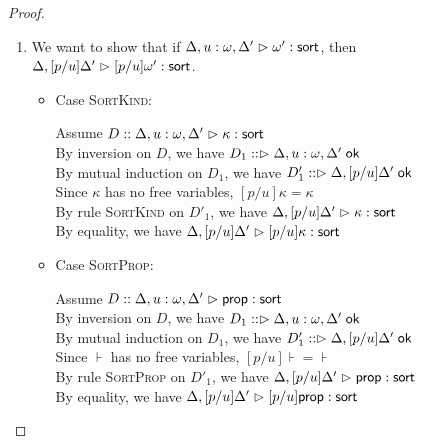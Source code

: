 \begin{proof}
\begin{enumerate}
\item We want to show that if 
         $\judgeSort[\Delta, u:\omega, \Delta']{\omega'}$,  then
         $\judgeSort[{\Delta, [p/u]\Delta'}]{[p/u]\omega'}$. 

  \begin{itemize}
  \item Case \textsc{SortKind}: 
    \begin{tabbedproof}
      \oo Assume $D :: \judgeSort[\Delta, u:\omega, \Delta']{\kappa}$ \\
      \ooo By inversion on $D$, we have $D_1 :: \judgeACtx{\Delta, u:\omega, \Delta'}$ \\
      \ooo By mutual induction on $D_1$, we have 
             $D'_1 :: \judgeACtx{\Delta, [p/u]\Delta'}$ \\
      \ooo Since $\kappa$ has no free variables, $[p/u]\kappa = \kappa$ \\
      \ooo By rule \textsc{SortKind} on $D'_1$, we have 
             $\judgeSort[{\Delta, [p/u]\Delta'}]{\kappa}$ \\
      \ooo By equality, we have 
             $\judgeSort[{\Delta, [p/u]\Delta'}]{[p/u]\kappa}$ \\
    \end{tabbedproof}

  \item Case \textsc{SortProp}: 
    \begin{tabbedproof}
      \oo Assume $D :: \judgeSort[\Delta, u:\omega, \Delta']{\assert}$ \\
      \ooo By inversion on $D$, we have $D_1 :: \judgeACtx{\Delta, u:\omega, \Delta'}$ \\
      \ooo By mutual induction on $D_1$, we have 
             $D'_1 :: \judgeACtx{\Delta, [p/u]\Delta'}$ \\
      \ooo Since $\assert$ has no free variables, $[p/u]\assert = \assert$ \\
      \ooo By rule \textsc{SortProp} on $D'_1$, we have 
             $\judgeSort[{\Delta, [p/u]\Delta'}]{\assert}$ \\
      \ooo By equality, we have 
             $\judgeSort[{\Delta, [p/u]\Delta'}]{[p/u]\assert}$ \\
    \end{tabbedproof}


\end{itemize}
\end{enumerate}
\end{proof}
